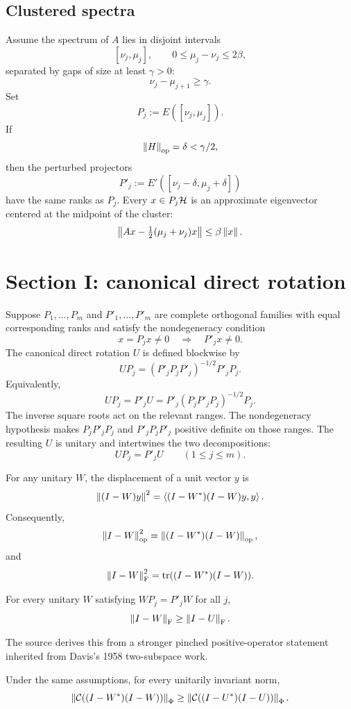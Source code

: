 \subsection{Clustered spectra}

Assume the spectrum of $A$ lies in disjoint intervals
\[
  [\nu_j,\mu_j],\qquad 0\le\mu_j-\nu_j\le 2\beta,
\]
separated by gaps of size at least $\gamma>0$:
\[
  \nu_j-\mu_{j+1}\ge\gamma.
\]
Set
\[
  P_j:=E([\nu_j,\mu_j]).
\]
If
\[
  \left\lVert H\right\rVert_{\mathrm{op}}=\delta<\gamma/2,
\]
then the perturbed projectors
\[
  P'_j:=E'([\nu_j-\delta,\mu_j+\delta])
\]
have the same ranks as $P_j$. Every $x\in P_j\mathcal{H}$ is an approximate eigenvector centered at the midpoint of the cluster:
\[
  \left\lVert Ax-\tfrac12(\mu_j+\nu_j)x\right\rVert
  \le \beta\left\lVert x\right\rVert.
\]

\section{Section I: canonical direct rotation}


Suppose $P_1,\dots,P_m$ and $P'_1,\dots,P'_m$ are complete orthogonal families with equal corresponding ranks and satisfy the nondegeneracy condition
\[
  x=P_jx\ne0\quad\Longrightarrow\quad P'_jx\ne0.
\]
The canonical direct rotation $U$ is defined blockwise by
\[
  UP_j=(P'_jP_jP'_j)^{-1/2}P'_jP_j.
\]
Equivalently,
\[
  UP_j=P'_jU
  =P'_j(P_jP'_jP_j)^{-1/2}P_j.
\]
The inverse square roots act on the relevant ranges. The nondegeneracy hypothesis makes $P_jP'_jP_j$ and $P'_jP_jP'_j$ positive definite on those ranges. The resulting $U$ is unitary and intertwines the two decompositions:
\[
  UP_j=P'_jU\qquad(1\le j\le m).
\]

For any unitary $W$, the displacement of a unit vector $y$ is
\[
  \left\lVert (I-W)y\right\rVert^2
  =\left\langle (I-W^*)(I-W)y,y\right\rangle.
\]
Consequently,
\[
  \left\lVert I-W\right\rVert_{\mathrm{op}}^2
  =\left\lVert (I-W^*)(I-W)\right\rVert_{\mathrm{op}},
\]
and
\[
  \left\lVert I-W\right\rVert_{\mathrm{F}}^2
  =\operatorname{tr}((I-W^*)(I-W)).
\]

\begin{theorem}
For every unitary $W$ satisfying $WP_j=P'_jW$ for all $j$,
\[
  \left\lVert I-W\right\rVert_{\mathrm{F}}\ge \left\lVert I-U\right\rVert_{\mathrm{F}}.
\]
\end{theorem}

The source derives this from a stronger pinched positive-operator statement inherited from Davis's 1958 two-subspace work.

\begin{theorem}
Under the same assumptions, for every unitarily invariant norm,
\[
  \left\lVert \mathcal{C}((I-W^*)(I-W))\right\rVert_{\Phi}
  \ge
  \left\lVert \mathcal{C}((I-U^*)(I-U))\right\rVert_{\Phi}.
\]
\end{theorem}

